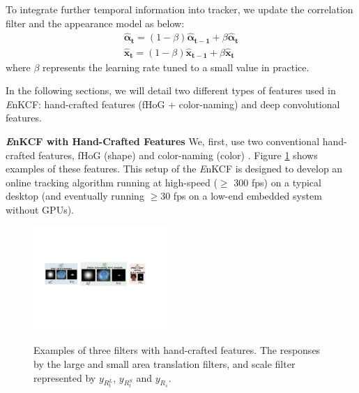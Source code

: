 \documentclass[10pt,twocolumn,letterpaper]{article}
\begin{document}
To integrate further temporal information into tracker, we update the
correlation filter and the appearance model as below:
\begin{align}
\boldsymbol{\hat{\alpha}_{t}} = (1-\beta) \boldsymbol{\hat{\alpha}_{t-1}} + \beta \boldsymbol{\hat{\alpha}_{t}} \\
\boldsymbol{\hat{x}_{t}} = (1-\beta) \boldsymbol{\hat{x}_{t-1}} + \beta \boldsymbol{\hat{x}_{t}}
\end{align}
where $\beta$ represents the learning rate tuned to a small value in practice.

In the following sections, we will detail two different types of
features used in {\it E}nKCF: hand-crafted features (fHoG +
color-naming) and deep convolutional features.

\textbf{{\it E}nKCF with Hand-Crafted Features} We, first, use two
conventional hand-crafted features, fHoG (shape)
\cite{felzenszwalb2010object} and color-naming (color)
\cite{li2014scale}. Figure \ref{fig:Filters} shows examples of these
features. This setup of the {\it E}nKCF is designed to develop an
online tracking algorithm running at high-speed ($\ge$ 300 fps) on a
typical desktop (and eventually running $\ge 30$ fps on a low-end
embedded system without GPUs).
\begin{figure}[!h]
\centering
\includegraphics[width=0.47\textwidth]{./figures/Filters_Details.pdf}
   \\[-3ex]
\label{fig:Rt_S}
\quad{}\label{fig:Rt_L}
\quad\quad{}\label{fig:Rs}
\caption{Examples of three filters with hand-crafted features. The
  responses by the large and small area translation filters, and scale
  filter represented by $y_{R_{t}^{L}}$, $y_{R_{t}^{S}}$ and
  $y_{R_{s}}$.}
\label{fig:Filters}
\end{figure}
\end{document}
